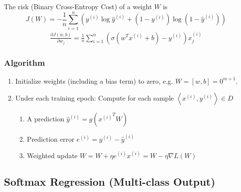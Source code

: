 \documentclass[11pt,a4paper]{article}
\begin{document}
The risk (Binary Cross-Entropy Cost) of a weight $W$ is $$J(W)=-\frac{1}{n}\sum_{i=1}^n(y^{(i)}\log\hat{y}^{(i)}+(1-y^{(i)})\log(1-\hat{y}^{(i)}))$$
\begin{equation}
    \begin{aligned}
        \frac{\partial J(w,b)}{\partial w_j}=\frac{1}{n}\sum_{i=1}^n\left(\sigma(w^Tx^{(i)}+b)-y^{(i)}\right)x_j^{(i)}
    \end{aligned}
    \nonumber
\end{equation}

\subsubsection{Algorithm}
\begin{enumerate}[$\bullet$]
    \item Initialize weights (including a bias term) to zero, e.g. $W=[w,b]=0^{m+1}$.
    \item Under each training epoch: Compute for each sample $\left\langle x^{(i)},y^{(i)}\right\rangle\in D$
    \begin{enumerate}[$\cdot$]
        \item A prediction $\hat{y}^{(i)}=g({x^{(i)}}^TW)$
        \item Prediction error $e^{(i)}=y^{(i)}-\hat{y}^{(i)}$
        \item Weighted update $W=W+\eta e^{(i)}x^{(i)}=W-\eta \nabla L(W)$
    \end{enumerate}
\end{enumerate}

\subsection{Softmax Regression (Multi-class Output)}
\end{document}
